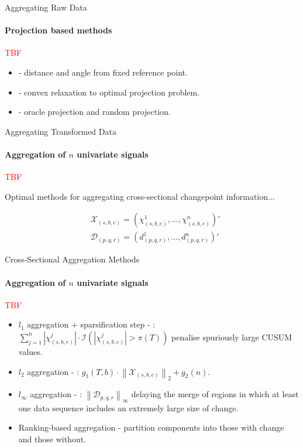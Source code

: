 \documentclass{beamer}
\begin{document}
\begin{frame}{Aggregating Raw Data}
\framesubtitle{Projection based methods}
    
\textcolor{red}{TBF}
    
\begin{itemize}
    \item \cite{grundy2020high} - distance and angle from fixed reference point.
    \item \cite{wang2018high} - convex relaxation to optimal projection problem. 
    \item \cite{aston2014efficiency} - oracle projection and random projection. 
\end{itemize}
    
\end{frame}




\begin{frame}{Aggregating Transformed Data}
\framesubtitle{Aggregation of $n$ univariate signals}

\textcolor{red}{TBF}

Optimal methods for aggregating cross-sectional changepoint information... 

\begin{align*}
    & \mathcal{X}_{(s,b,e)} = \left (\chi_{(s,b,e)}^1, ..., \chi_{(s,b,e)}^n \right )' \\
    & \mathcal{D}_{(p,q,r)} = \left ( d_{(p,q,r)}^1, ..., d_{(p,q,r)}^n \right ) '  
\end{align*}
    
\end{frame}

\begin{frame}{Cross-Sectional Aggregation Methods}
\framesubtitle{Aggregation of $n$ univariate signals}
    
\textcolor{red}{TBF}
    
\begin{itemize}
    \item $l_1$ aggregation + sparsification step - \cite{cho2015multiple}: $\sum_{j=1}^n \left | \chi^j_{(s,b,e)} \right | \cdot \mathcal{I} \left ( \left | \chi^j_{(s,b,e)} \right | > \pi(T) \right ) $ penalise spuriously large CUSUM values. 
    \item $l_2$ aggregation - \cite{enikeeva2013high}: $g_1(T,b) \cdot \left \| \mathcal{X}_{(s,b,e)} \right \|_2 + g_2(n)$.
    \item $l_\infty$ aggregation - \cite{maeng2019adaptive}: $\left \| \mathcal{D}_{p,q,r} \right \|_\infty$ delaying the merge of regions in which at least one data sequence includes an extremely large size of change. 
    \item Ranking-based aggregation \cite{cho2015multiple} - partition components into those with change and those without. 
\end{itemize}
    
\end{frame}
\end{document}
